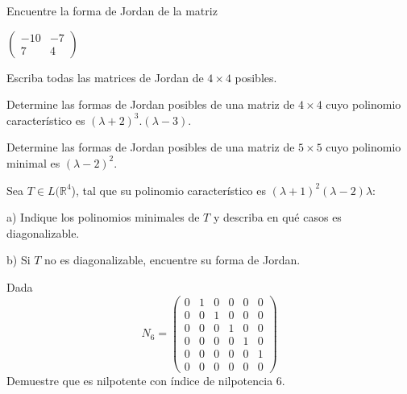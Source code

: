 \begin{exercise} 

\item
Encuentre la forma de Jordan de la matriz

\bigskip
 
$ \left(\begin{array}{cc}-10 & -7 \\7 & 4
\end{array}
 \right)$

\end{exercise} 
\begin{exercise} 

\item

Escriba todas las  matrices de Jordan de $ 4 \times 4$ posibles.

\end{exercise} 
\begin{exercise} 
\item

Determine las formas de Jordan posibles de una matriz de $ 4 \times 4$  cuyo polinomio característico es 
$ (\lambda +2)^3.(\lambda -3)$.

\end{exercise} 
\begin{exercise} 
\item

Determine las formas de Jordan posibles de una matriz de $ 5 \times 5$  cuyo polinomio minimal es 
$ (\lambda -2)^2$.
\end{exercise} 
\begin{exercise} 

\item

Sea $T \in L(\mathbb{R}^4$), tal que su polinomio característico es $(\lambda+1)^2(\lambda-2) \lambda$:

\bigskip

a) Indique los polinomios minimales de $T$ y describa en qué casos es diagonalizable.

\bigskip

b) Si $T$ no es diagonalizable, encuentre su forma de Jordan.

\end{exercise} 


\newpage


\begin{exercise} 
\item
Dada \[N_6=\left(\begin{array}{cccccc}0 & 1 & 0 &0 &0 &0  \\ 0& 0 & 1 & 0 &0
& 0\\ 0  & 0 & 0 &1 & 0 & 0\\0 & 0 & 0 & 0 &1 &0 \\0 & 0 & 0 & 0 &0 &1\\0 & 0 & 0 & 0 & 0 & 0                        
\end{array}
 \right)
\]
Demuestre que es nilpotente con índice de nilpotencia $6$.

\end{exercise} 

